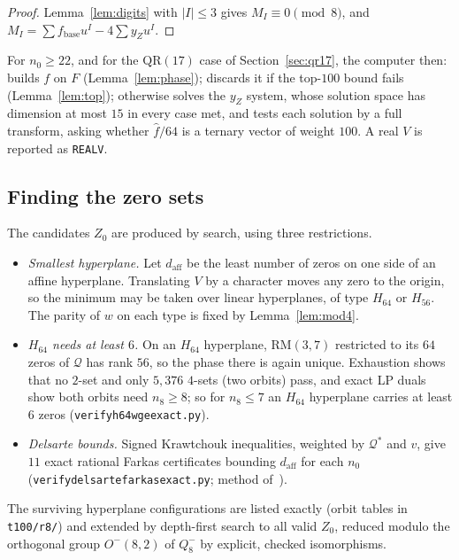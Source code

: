 \documentclass[11pt]{article}
\theoremstyle{definition}
\theoremstyle{remark}
\newcommand{\RM}{\mathrm{RM}}
\newcommand{\code}[1]{\texttt{#1}}
\DeclareRobustCommand{\_}{\textunderscore\allowbreak}
\begin{document}
\begin{proof}
Lemma~\ref{lem:digits} with $|I|\le3$ gives $M_I\equiv0\pmod8$, and $M_I=\sum f_{\mathrm{base}}u^I-4\sum y_Zu^I$.
\end{proof}

For $n_0\ge22$, and for the $\mathrm{QR}(17)$ case of Section~\ref{sec:qr17}, the computer then: builds $f$ on $F$ (Lemma~\ref{lem:phase}); discards it if the top-$100$ bound fails (Lemma~\ref{lem:top}); otherwise solves the $y_Z$ system, whose solution space has dimension at most $15$ in every case met, and tests each solution by a full transform, asking whether $\widehat f/64$ is a ternary vector of weight $100$. A real $V$ is reported as \code{REAL\_V}.

\subsection{Finding the zero sets}

The candidates $Z_0$ are produced by search, using three restrictions.
\begin{itemize}[nosep]
\item \emph{Smallest hyperplane.} Let $d_{\mathrm{aff}}$ be the least number of zeros on one side of an affine hyperplane. Translating $V$ by a character moves any zero to the origin, so the minimum may be taken over linear hyperplanes, of type $H_{64}$ or $H_{56}$. The parity of $w$ on each type is fixed by Lemma~\ref{lem:mod4}.
\item \emph{$H_{64}$ needs at least $6$.} On an $H_{64}$ hyperplane, $\RM(3,7)$ restricted to its $64$ zeros of $\mathcal Q$ has rank $56$, so the phase there is again unique. Exhaustion shows that no $2$-set and only $5{,}376$ $4$-sets (two orbits) pass, and exact LP duals show both orbits need $n_8\ge8$; so for $n_8\le7$ an $H_{64}$ hyperplane carries at least $6$ zeros (\code{verify\_h64\_w\_ge\_6\_exact.py}).
\item \emph{Delsarte bounds.} Signed Krawtchouk inequalities, weighted by $\mathcal Q^*$ and $v$, give $11$ exact rational Farkas certificates bounding $d_{\mathrm{aff}}$ for each $n_0$ (\code{verify\_delsarte\_farkas\_exact.py}; method of~\cite{Delsarte}).
\end{itemize}
The surviving hyperplane configurations are listed exactly (orbit tables in \code{t100/r8/}) and extended by depth-first search to all valid $Z_0$, reduced modulo the orthogonal group $O^-(8,2)$ of $Q_8^-$ by explicit, checked isomorphisms.
\end{document}
